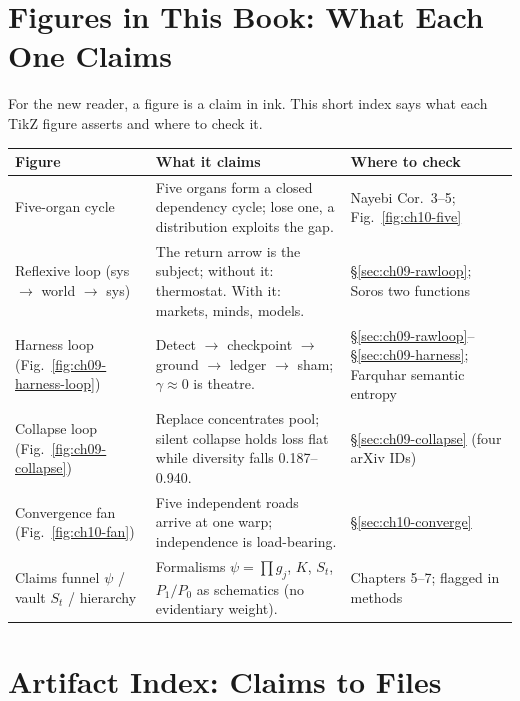 \section{Figures in This Book: What Each One Claims}
\label{sec:appendix-figures}

For the new reader, a figure is a claim in ink. This short index says what each TikZ figure asserts and where to check it.

\begin{center}
\small
\begin{tabular}{p{3.2cm}p{6.0cm}p{3.4cm}}
\toprule
Figure & What it claims & Where to check \\
\midrule
Five-organ cycle & Five organs form a closed dependency cycle; lose one, a distribution exploits the gap. & Nayebi Cor.\ 3--5; Fig.~\ref{fig:ch10-five} \\
Reflexive loop (sys $\to$ world $\to$ sys) & The return arrow is the subject; without it: thermostat. With it: markets, minds, models. & \S\ref{sec:ch09-rawloop}; Soros two functions \\
Harness loop (Fig.~\ref{fig:ch09-harness-loop}) & Detect $\to$ checkpoint $\to$ ground $\to$ ledger $\to$ sham; $\gamma\approx0$ is theatre. & \S\ref{sec:ch09-rawloop}--\S\ref{sec:ch09-harness}; Farquhar semantic entropy \\
Collapse loop (Fig.~\ref{fig:ch09-collapse}) & Replace concentrates pool; silent collapse holds loss flat while diversity falls 0.187--0.940. & \S\ref{sec:ch09-collapse} (four arXiv IDs) \\
Convergence fan (Fig.~\ref{fig:ch10-fan}) & Five independent roads arrive at one warp; independence is load-bearing. & \S\ref{sec:ch10-converge} \\
Claims funnel $\psi$ / vault $S_t$ / hierarchy & Formalisms $\psi=\prod g_j$, $K$, $S_t$, $P_1/P_0$ as schematics (no evidentiary weight). & Chapters 5--7; flagged in methods \\
\bottomrule
\end{tabular}
\end{center}

\section{Artifact Index: Claims to Files}
\label{sec:appendix-artifacts}

